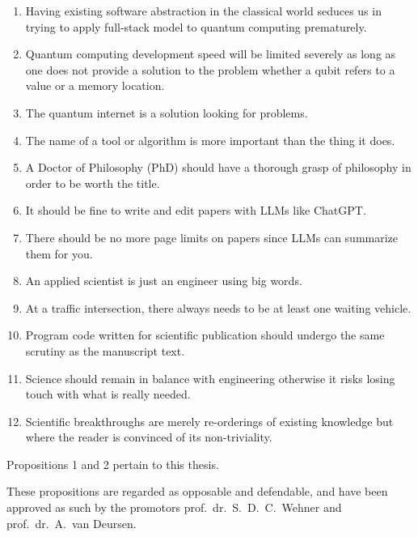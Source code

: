 \begin{enumerate}[widest=10]
  \item Having existing software abstraction in the classical world seduces us in trying to apply full-stack model to quantum computing prematurely.

  \item Quantum computing development speed will be limited severely as long as one does not provide a solution to the problem whether a qubit refers to a value or a memory location.

  \item The quantum internet is a solution looking for problems.

  \item The name of a tool or algorithm is more important than the thing it does.

  \item A Doctor of Philosophy (PhD) should have a thorough grasp of philosophy in order to be worth the title.

  \item It should be fine to write and edit papers with LLMs like ChatGPT.

  \item There should be no more page limits on papers since LLMs can summarize them for you.

  \item An applied scientist is just an engineer using big words.

  \item At a traffic intersection, there always needs to be at least one waiting vehicle.

  \item Program code written for scientific publication should undergo the same scrutiny as the manuscript text.

  \item Science should remain in balance with engineering otherwise it risks losing touch with what is really needed.

  \item Scientific breakthroughs are merely re-orderings of existing knowledge but where the reader is convinced of its non-triviality.
\end{enumerate}

\bigskip \noindent
Propositions 1 and 2 pertain to this thesis.

\bigskip \noindent
These propositions are regarded as opposable and defendable, and have been approved as such by the
promotors prof.\ dr.\ S.\ D.\ C.\ Wehner and prof.\ dr.\ A.\ van Deursen.
